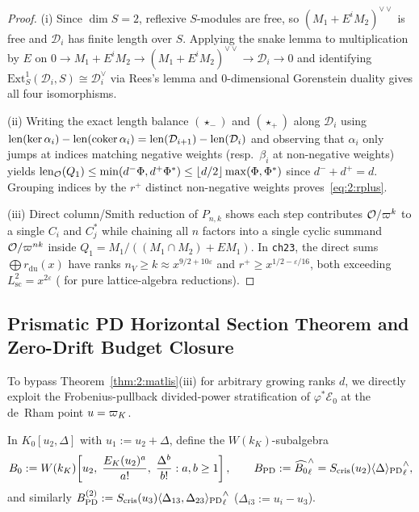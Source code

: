 \begin{proof}
(i) Since $\dim S = 2$, reflexive $S$-modules are free, so $(M_1 + E^i M_2)^{\vee\vee}$ is free and $\mathcal{D}_i$ has finite length over $S$. Applying the snake lemma to multiplication by $E$ on $0 \to M_1 + E^i M_2 \to (M_1 + E^i M_2)^{\vee\vee} \to \mathcal{D}_i \to 0$ and identifying $\mathrm{Ext}^1_S(\mathcal{D}_i, S) \cong \mathcal{D}_i^\vee$ via Rees's lemma and 0-dimensional Gorenstein duality gives all four isomorphisms.

(ii) Writing the exact length balance $(\star_-)$ and $(\star_+)$ along $\mathcal{D}_i$ using $\operatorname{len}(\ker\alpha_i) - \operatorname{len}(\operatorname{coker}\alpha_i) = \operatorname{len}(\mathcal{D}_{i+1}) - \operatorname{len}(\mathcal{D}_i)$ and observing that $\alpha_i$ only jumps at indices matching negative weights (resp.\ $\beta_i$ at non-negative weights) yields $\operatorname{len}_{\mathcal{O}}(Q_1) \le \min(d^- \Phi, d^+ \Phi^*) \le \lfloor d/2 \rfloor \max(\Phi, \Phi^*)$ since $d^- + d^+ = d$. Grouping indices by the $r^+$ distinct non-negative weights proves~\eqref{eq:2:rplus}.

(iii) Direct column/Smith reduction of $P_{n,k}$ shows each step contributes $\mathcal{O}/\varpi^k$ to a single $C_i$ and $C_j^*$ while chaining all $n$ factors into a single cyclic summand $\mathcal{O}/\varpi^{nk}$ inside $Q_1 = M_1/((M_1 \cap M_2) + E M_1)$. In \texttt{ch23}, the direct sums $\bigoplus r_{\mathrm{du}}(x)$ have ranks $n_V \ge k \approx x^{9/2 + 10\varepsilon}$ and $r^+ \ge x^{1/2-\varepsilon/16}$, both exceeding $L_{\mathrm{sc}}^2 = x^{2\varepsilon}$ (\tagObs{} for pure lattice-algebra reductions).
\end{proof}

\subsection{Prismatic PD Horizontal Section Theorem and Zero-Drift Budget Closure}\label{sec:2:pd}

To bypass Theorem~\ref{thm:2:matlis}(iii) for arbitrary growing ranks $d$, we directly exploit the Frobenius-pullback divided-power stratification of $\varphi^*\mathcal{E}_0$ at the de~Rham point $u = \varpi_K$.

In $K_0[u_2, \Delta]$ with $u_1 := u_2 + \Delta$, define the $W(k_K)$-subalgebra
\[
  B_0 := W(k_K)\!\left[u_2,\; \frac{E_K(u_2)^a}{a!},\; \frac{\Delta^b}{b!} : a, b \ge 1\right], \qquad B_{\mathrm{PD}} := \widehat{B_0}^\wedge_\ell = S_{\mathrm{cris}}(u_2){\langle \Delta \rangle_{\mathrm{PD}}}^\wedge_\ell,
\]
and similarly $B_{\mathrm{PD}}^{(2)} := S_{\mathrm{cris}}(u_3){\langle \Delta_{13}, \Delta_{23} \rangle_{\mathrm{PD}}}^\wedge_\ell$ ($\Delta_{i3} := u_i - u_3$).

